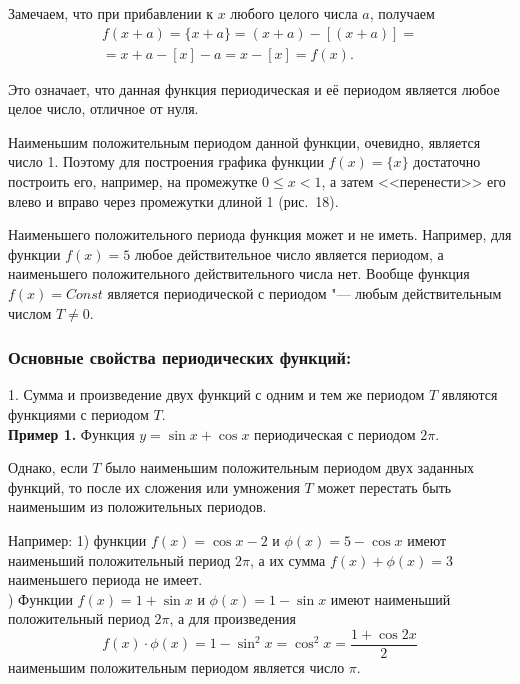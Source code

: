 Замечаем, что при прибавлении к $x$ любого целого числа $a$, получаем
\begin{multline}
f(x+a) = \{x+a\} = (x+a) - [(x+a)] = \\
= x+a - [x] - a = x - [x] = f(x).
\end{multline}

Это означает, что данная функция периодическая и её периодом является
любое целое число, отличное от нуля.

Наименьшим положительным периодом данной функции, очевидно, является число 1.
Поэтому для построения графика функции $f(x) = \{x\}$ достаточно построить его,
например, на промежутке $0 \leqslant x  <  1$,  а затем <<перенести>> его
влево и вправо через промежутки длиной 1 (рис.\ 18).

\begin{figure}
\end{figure}

\begin{Note} Наименьшего положительного периода функция может и не иметь.
Например, для функции $f(x) = 5$ любое действительное число является периодом,
а наименьшего положительного действительного числа нет. Вообще функция $f(x) = Const$
является периодической с периодом "--- любым действительным числом $T \ne 0$.
\end{Note}


\subsubsection{Основные свойства периодических функций:}

1. Сумма и произведение двух функций с одним и тем же периодом $T$
являются функциями с периодом $T$.\\

\indent \textbf{Пример 1.} Функция $y = \sin x + \cos x$ периодическая с периодом $2\pi$.

\begin{Note} Однако, если $T$ было наименьшим положительным периодом
двух заданных функций, то после их сложения или умножения $T$ может перестать
быть наименьшим из положительных периодов.
\end{Note}

\indent Например: 1) функции $f(x) = \cos x - 2$ и $\phi(x) = 5 - \cos x$ имеют
наименьший положительный период $2\pi$, а их сумма $f(x) + \phi(x) = 3$
наименьшего периода не имеет. \\
) Функции $f(x) = 1 + \sin x$ и $\phi(x) = 1 - \sin x$ имеют наименьший
положительный период $2\pi$,
а для произведения
\begin{equation*}
f(x) \cdot \phi(x) = 1 - \sin^{2} x = \cos^{2} x = \displaystyle\frac{1 + \cos 2 x}{2}
\end{equation*}
наименьшим положительным периодом является число $\pi$. \\

